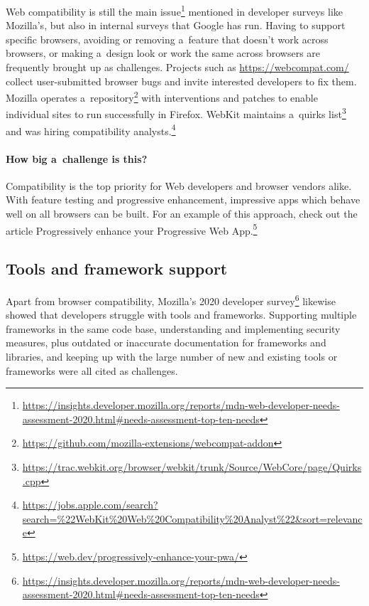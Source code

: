 \documentclass[sigconf]{acmart}
\begin{document}
Web compatibility is still the main issue\footnote{\url{https://insights.developer.mozilla.org/reports/mdn-web-developer-needs-assessment-2020.html\#needs-assessment-top-ten-needs}} mentioned in developer surveys like Mozilla's, but also in internal surveys that Google has run. Having to support specific browsers, avoiding or removing a~feature that doesn't work across browsers, or making a~design look or work the same across browsers are frequently brought up as challenges. Projects such as \url{https://webcompat.com/} collect user-submitted browser bugs and invite interested developers to fix them. Mozilla operates a~repository\footnote{\url{https://github.com/mozilla-extensions/webcompat-addon}} with interventions and patches to enable individual sites to run successfully in Firefox. WebKit maintains a~quirks list\footnote{\url{https://trac.webkit.org/browser/webkit/trunk/Source/WebCore/page/Quirks.cpp}} and was hiring compatibility analysts.\footnote{\url{https://jobs.apple.com/search?search=\%22WebKit\%20Web\%20Compatibility\%20Analyst\%22&sort=relevance}}

\paragraph{How big a~challenge is this?}

Compatibility is the top priority for Web developers and browser vendors alike. With feature testing and progressive enhancement, impressive apps which behave well on all browsers can be built. For an example of this approach, check out the article Progressively enhance your Progressive Web App.\footnote{\url{https://web.dev/progressively-enhance-your-pwa/}}

\subsection{Tools and framework support}

Apart from browser compatibility, Mozilla's 2020 developer survey\footnote{\url{https://insights.developer.mozilla.org/reports/mdn-web-developer-needs-assessment-2020.html\#needs-assessment-top-ten-needs}} likewise showed that developers struggle with tools and frameworks. Supporting multiple frameworks in the same code base, understanding and implementing security measures, plus outdated or inaccurate documentation for frameworks and libraries, and keeping up with the large number of new and existing tools or frameworks were all cited as challenges.
\end{document}
